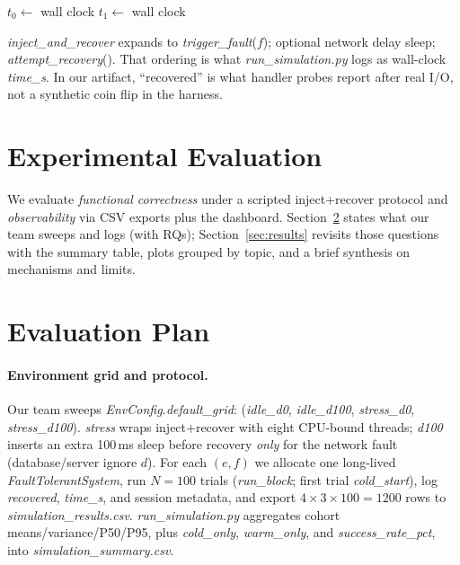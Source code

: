 \documentclass[sigconf,authorversion,nonacm]{acmart}
\begin{document}
\begin{algorithm}[!t]
\caption{Single batch evaluation trial (environment-aware)}
\label{alg:trial}
$t_0 \leftarrow$ wall clock\;
$t_1 \leftarrow$ wall clock\;
\;
\end{algorithm}
\noindent \emph{inject\_and\_recover} expands to \emph{trigger\_fault}($f$); optional network delay sleep; \emph{attempt\_recovery}(). That ordering is what \emph{run\_simulation.py} logs as wall-clock \emph{time\_s}. In our artifact, ``recovered'' is what handler probes report after real I/O, not a synthetic coin flip in the harness.

\section{Experimental Evaluation}
\label{sec:eval}
We evaluate \emph{functional correctness} under a scripted inject+recover protocol and \emph{observability} via CSV exports plus the dashboard. Section~\ref{sec:plan} states what our team sweeps and logs (with RQs); Section~\ref{sec:results} revisits those questions with the summary table, plots grouped by topic, and a brief synthesis on mechanisms and limits.

\section{Evaluation Plan}
\label{sec:plan}
\paragraph{Environment grid and protocol.}
Our team sweeps \emph{EnvConfig.default\_grid}: (\emph{idle\_d0}, \emph{idle\_d100}, \emph{stress\_d0}, \emph{stress\_d100}). \emph{stress} wraps inject+recover with eight CPU-bound threads; \emph{d100} inserts an extra 100\,ms sleep before recovery \emph{only} for the network fault (database/server ignore $d$). For each $(e,f)$ we allocate one long-lived \emph{FaultTolerantSystem}, run $N{=}100$ trials (\emph{run\_block}; first trial \emph{cold\_start}), log \emph{recovered}, \emph{time\_s}, and session metadata, and export $4{\times}3{\times}100=1200$ rows to \emph{simulation\_results.csv}. \emph{run\_simulation.py} aggregates cohort means/variance/P50/P95, plus \emph{cold\_only}, \emph{warm\_only}, and \emph{success\_rate\_pct}, into \emph{simulation\_summary.csv}.
\end{document}

